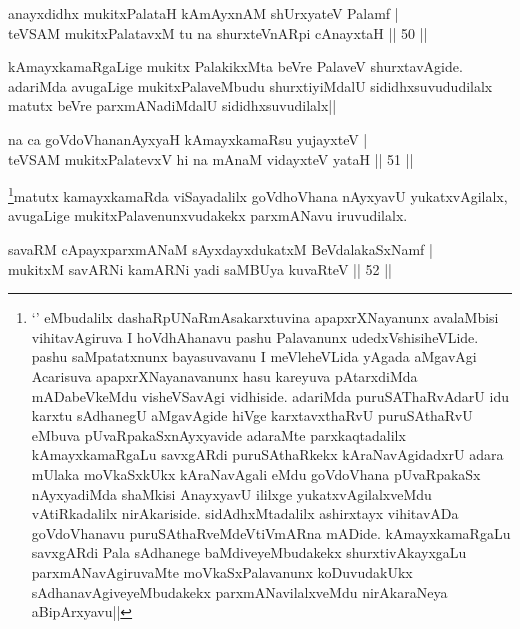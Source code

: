 
\begin{shl}
anayxdidhx mukitxPalataH kAmAyxnAM shUrxyateV Palamf |\\
teVSAM mukitxPalatavxM tu na shurxteVnARpi cAnayxtaH \hfill || 50 ||
\end{shl}

\begin{artha}
kAmayxkamaRgaLige mukitx PalakikxMta beVre PalaveV shurxtavAgide. adariMda avugaLige mukitxPalaveMbudu shurxtiyiMdalU sididhxsuvududilalx matutx beVre parxmANadiMdalU sididhxsuvudilalx||
\end{artha}

\begin{shl}
na ca goVdoVhananAyxyaH kAmayxkamaRsu yujayxteV |\\
teVSAM mukitxPalatevxV hi na mAnaM vidayxteV yataH \hfill || 51 ||
\end{shl}

\begin{artha}
\footnote{`\stext' eMbudalilx dashaRpUNaRmAsakarxtuvina apapxrXNayanunx avalaMbisi vihitavAgiruva I hoVdhAhanavu pashu Palavanunx udedxVshisiheVLide. pashu saMpatatxnunx bayasuvavanu I meVleheVLida yAgada aMgavAgi Acarisuva apapxrXNayanavanunx hasu kareyuva pAtarxdiMda mADabeVkeMdu visheVSavAgi vidhiside. adariMda puruSAThaRvAdarU idu karxtu sAdhanegU aMgavAgide hiVge karxtavxthaRvU puruSAthaRvU eMbuva pUvaRpakaSxnAyxyavide adaraMte parxkaqtadalilx kAmayxkamaRgaLu savxgARdi puruSAthaRkekx kAraNavAgidadxrU adara mUlaka moVkaSxkUkx kAraNavAgali eMdu goVdoVhana pUvaRpakaSx nAyxyadiMda shaMkisi AnayxyavU ililxge yukatxvAgilalxveMdu vAtiRkadalilx nirAkariside. sidAdhxMtadalilx ashirxtayx vihitavADa goVdoVhanavu puruSAthaRveMdeVtiVmARna mADide. kAmayxkamaRgaLu savxgARdi Pala sAdhanege baMdiveyeMbudakekx shurxtivAkayxgaLu parxmANavAgiruvaMte moVkaSxPalavanunx koDuvudakUkx sAdhanavAgiveyeMbudakekx parxmANavilalxveMdu nirAkaraNeya aBipArxyavu||}matutx kamayxkamaRda viSayadalilx goVdhoVhana nAyxyavU yukatxvAgilalx, avugaLige mukitxPalavenunxvudakekx parxmANavu iruvudilalx.
\end{artha}


\begin{shl}
savaRM cApayxparxmANaM sAyxdayxdukatxM BeVdalakaSxNamf |\\
mukitxM savARNi kamARNi yadi saMBUya kuvaRteV \hfill || 52 ||
\end{shl}

